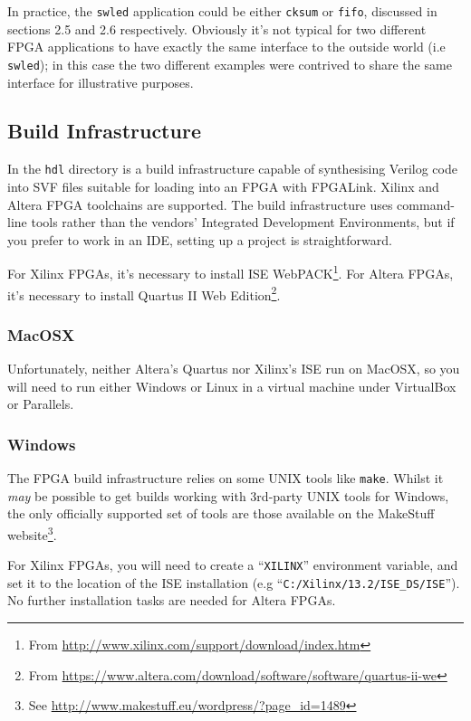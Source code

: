 In practice, the \texttt{swled} application could be either \texttt{cksum} or \texttt{fifo}, discussed in sections 2.5 and 2.6 respectively. Obviously it's not typical for two different FPGA applications to have exactly the same interface to the outside world (i.e \texttt{swled}); in this case the two different examples were contrived to share the same interface for illustrative purposes.

\subsection{Build Infrastructure}
In the \texttt{hdl} directory is a build infrastructure capable of synthesising Verilog code into SVF files suitable for loading into an FPGA with FPGALink. Xilinx and Altera FPGA toolchains are supported. The build infrastructure uses command-line tools rather than the vendors' Integrated Development Environments, but if you prefer to work in an IDE, setting up a project is straightforward.

For Xilinx FPGAs, it's necessary to install ISE WebPACK\footnote{From \url{http://www.xilinx.com/support/download/index.htm}}. For Altera FPGAs, it's necessary to install Quartus II Web Edition\footnote{From \url{https://www.altera.com/download/software/software/quartus-ii-we}}.

\subsubsection{MacOSX}
Unfortunately, neither Altera's Quartus nor Xilinx's ISE run on MacOSX, so you will need to run either Windows or Linux in a virtual machine under VirtualBox or Parallels.

\subsubsection{Windows}
The FPGA build infrastructure relies on some UNIX tools like \texttt{make}. Whilst it \textit{may} be possible to get builds working with 3rd-party UNIX tools for Windows, the only officially supported set of tools are those available on the MakeStuff website\footnote{See \url{http://www.makestuff.eu/wordpress/?page_id=1489}}.

For Xilinx FPGAs, you will need to create a ``\texttt{XILINX}'' environment variable, and set it to the location of the ISE installation (e.g ``\texttt{C:/Xilinx/13.2/ISE\_DS/ISE}''). No further installation tasks are needed for Altera FPGAs.


